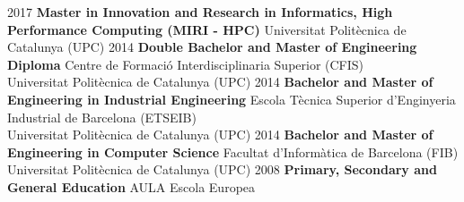 %
%
%


\vspace{1em}

\begin{scholarship}
    \scholarshipentry
        {2017}
        {\textbf{Master in Innovation and Research in Informatics, High Performance Computing (MIRI - HPC)}}
        {Universitat Politècnica de Catalunya (UPC)}
    \scholarshipentry
        {2014}
        {\textbf{Double Bachelor and Master of Engineering Diploma}}
        {Centre de Formació Interdisciplinaria Superior (CFIS) \\ Universitat Politècnica de Catalunya (UPC)}
    \scholarshipentry
        {2014}
        {\textbf{Bachelor and Master of Engineering in Industrial Engineering}}
        {Escola Tècnica Superior d'Enginyeria Industrial de Barcelona (ETSEIB) \\ Universitat Politècnica de Catalunya (UPC)}
    \scholarshipentry
        {2014}
        {\textbf{Bachelor and Master of Engineering in Computer Science}}
        {Facultat d'Informàtica de Barcelona (FIB) \\ Universitat Politècnica de Catalunya (UPC)}
    \scholarshipentry
        {2008}
        {\textbf{Primary, Secondary and General Education}}
        {AULA Escola Europea}
\end{scholarship}